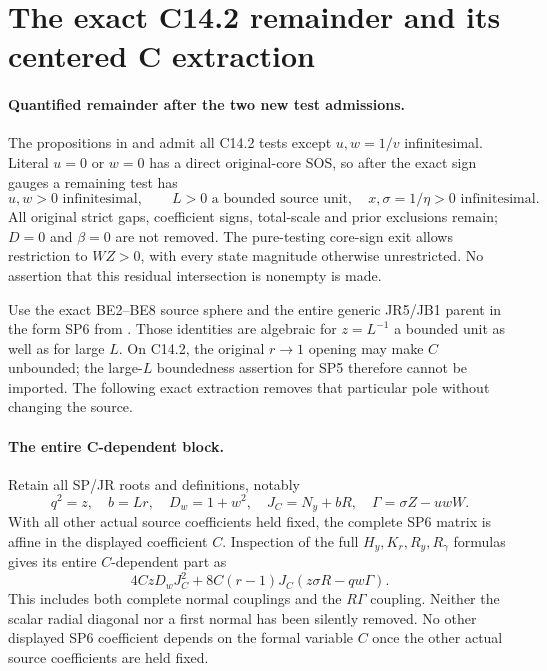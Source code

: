 \section{The exact C14.2 remainder and its centered C extraction}

\paragraph{Quantified remainder after the two new test admissions.}
The propositions in  and
 admit all C14.2 tests except $u,w=1/v$
infinitesimal.  Literal $u=0$ or $w=0$ has a direct original-core
SOS, so after the exact sign gauges a remaining test has
\[
 u,w>0\text{ infinitesimal},\qquad
 L>0\text{ a bounded source unit},\quad
 x,\sigma=1/\eta>0\text{ infinitesimal}.             \tag{LC1}
\]
All original strict gaps, coefficient signs, total-scale and prior
exclusions remain; $D=0$ and $\beta=0$ are not removed.
The pure-testing core-sign exit allows restriction to $WZ>0$,
with every state magnitude otherwise unrestricted.  No assertion
that this residual intersection is nonempty is made.

Use the exact BE2--BE8 source sphere and the entire generic JR5/JB1
parent in the form SP6 from
.
Those identities are algebraic for $z=L^{-1}$ a bounded unit as
well as for large $L$.  On C14.2, the original $r\to1$ opening
may make $C$ unbounded; the large-$L$ boundedness assertion for
SP5 therefore cannot be imported.  The following exact extraction
removes that particular pole without changing the source.

\paragraph{The entire C-dependent block.}
Retain all SP/JR roots and definitions, notably
\[
 q^2=z,\quad b=Lr,\quad D_w=1+w^2,\quad
 J_C=N_y+bR,\quad\Gamma=\sigma Z-uwW.
\]
With all other actual source coefficients held fixed, the complete
SP6 matrix is affine in the displayed coefficient $C$.  Inspection
of the full $H_y,K_r,R_y,R_\gamma$ formulas gives its entire
$C$-dependent part as
\[
 4CzD_wJ_C^2
       +8C(r-1)J_C(z\sigma R-qw\Gamma).            \tag{LC2}
\]
This includes both complete normal couplings and the $R\Gamma$
coupling.  Neither the scalar radial diagonal nor a first normal has
been silently removed.  No other displayed SP6 coefficient depends
on the formal variable $C$ once the other actual source coefficients
are held fixed.

